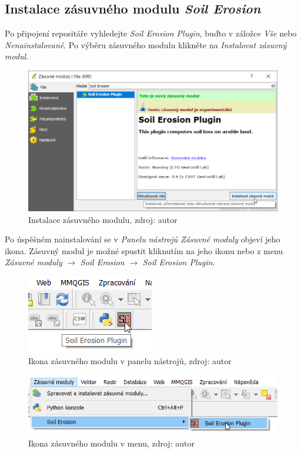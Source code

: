 \subsection{Instalace zásuvného modulu \textit{Soil Erosion}}
Po připojení repositáře vyhledejte \textit{Soil Erosion Plugin}, buďto v záložce \textit{Vše} nebo \textit{Nenainstalované}. Po výběru zásuvného modulu klikněte na \textit{Instalovat zásuvný modul}.

	\begin{figure}[H] \centering
		\includegraphics[width=.8\textwidth]{./pictures/instalace_pluginu.png}
		\caption[Instalace zásuvného modulu]{Instalace zásuvného modulu, zdroj: autor}
		\label{fig:manual_pridani_repozitare_geoforall_lab}
 	\end{figure}
	
Po úspěšném nainstalování se v \textit{Panelu nástrojů Zásuvné moduly} objeví jeho ikona. Zásuvný modul je možné spustit kliknutím na jeho ikonu nebo z menu \textit{Zásuvné moduly} $\rightarrow$  \textit{Soil Erosion} $\rightarrow$  \textit{Soil Erosion Plugin}.
	
	\begin{figure}[H] \centering
		\includegraphics[width=.3\textwidth]{./pictures/spusteni_pluginu2.png}
		\caption[Ikona zásuvného modulu v panelu nástrojů]{Ikona zásuvného modulu v panelu nástrojů, zdroj: autor}
		\label{ikona_modulu_v_panelu_nastroju}
 	\end{figure}	
	
	\begin{figure}[H] \centering
		\includegraphics[width=.7\textwidth]{./pictures/spusteni_pluginu1.png}
		\caption[Ikona zásuvného modulu v menu]{Ikona zásuvného modulu v menu, zdroj: autor}
		\label{ikona_modulu_v_panelu_nastroju2}
 	\end{figure}	

